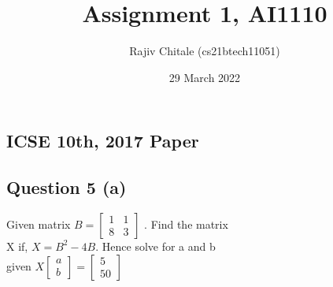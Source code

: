 \documentclass[journal,11pt,twocolumn]{article}
\title{Assignment 1, AI1110}
\author{Rajiv Chitale (cs21btech11051)}
\date{29 March 2022}
\begin{document}
\maketitle

\subsection*{ICSE 10th, 2017 Paper}
\subsection*{Question 5 (a)}
    Given matrix $B = \begin{bmatrix} 1 & 1 \\8 & 3 \end{bmatrix}$
    . Find the matrix 
    \\
    X if,  $X = B^2-4B$. Hence solve for a and b 
    \\
    given $X \begin{bmatrix}a\\b\end{bmatrix}
    = \begin{bmatrix} 5\\50 \end{bmatrix} $
\end{document}
